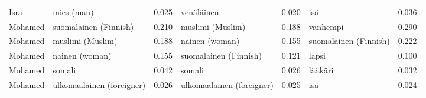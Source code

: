 \begin{longtable}{llrlrlr}
   Isra &                mies (man) &                            0.025 &                venäläinen &                                 0.020 &                       isä &                           0.036 \\
Mohamed &     suomalainen (Finnish) &                            0.210 &          muslimi (Muslim) &                                 0.188 &                  vanhempi &                           0.290 \\
Mohamed &          muslimi (Muslim) &                            0.188 &            nainen (woman) &                                 0.155 &     suomalainen (Finnish) &                           0.222 \\
Mohamed &            nainen (woman) &                            0.155 &     suomalainen (Finnish) &                                 0.121 &                     lapsi &                           0.100 \\
Mohamed &                    somali &                            0.042 &                    somali &                                 0.026 &                   lääkäri &                           0.032 \\
Mohamed & ulkomaalainen (foreigner) &                            0.026 & ulkomaalainen (foreigner) &                                 0.025 &                       isä &                           0.024 \\
\end{longtable}
